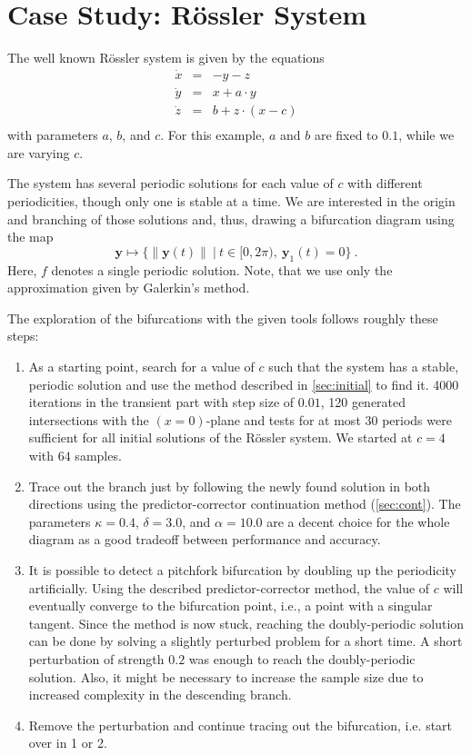 \section{Case Study: Rössler System}

The well known Rössler system is given by the equations
\[
	\begin{array}{rcl}
		\dot x &=& -y - z \\
		\dot y &=& x + a \cdot y \\
		\dot z &=& b + z \cdot (x - c) \\
	\end{array}
\]
with parameters $a$, $b$, and $c$. For this example, $a$ and $b$
are fixed to $0.1$, while we are varying $c$.

The system has several periodic solutions for each value of $c$ with different
periodicities, though only one is stable at a time. We are interested in the origin and
branching of those solutions and, thus, drawing a bifurcation diagram using the map
\[
	\mathbf y \mapsto \{ \|\mathbf y(t)\|  \ | \ t \in [0, 2\pi), \ \mathbf y_1(t) = 0 \} \ .
\]
Here, $f$ denotes a single periodic solution. Note, that we use only the approximation
given by Galerkin's method.

The exploration of the bifurcations with the given tools follows roughly these steps:
\begin{enumerate}
	\item As a starting point, search for a value of $c$ such that the system has a
		stable, periodic solution and use the method described in
		\autoref{sec:initial} to find it. 4000 iterations in the transient part with step
		size of $0.01$, 120 generated intersections with the $(x=0)$-plane and tests for
		at most $30$ periods were sufficient for all initial solutions of the Rössler
		system. We started at $c=4$ with $64$ samples.
	\item Trace out the branch just by following the newly found solution in both directions
		using the predictor-corrector continuation method (\autoref{sec:cont}). The
		parameters $\kappa=0.4$, $\delta=3.0$, and $\alpha=10.0$ are a decent choice for
		the whole diagram as a good tradeoff between performance and accuracy.
	\item It is possible to detect a pitchfork bifurcation by doubling up the periodicity
		artificially. Using the described predictor-corrector method, the value
		of $c$ will eventually converge to the bifurcation point, i.e., a point with a
		singular tangent. Since the method is now stuck, reaching the doubly-periodic
		solution can be done by solving a slightly perturbed problem for a short time.
		A short perturbation of strength $0.2$ was enough to reach the doubly-periodic
		solution. Also, it might be necessary to increase the sample size due to increased
		complexity in the descending branch.
	\item Remove the perturbation and continue tracing out the bifurcation, i.e. start
		over in 1 or 2.
\end{enumerate}

